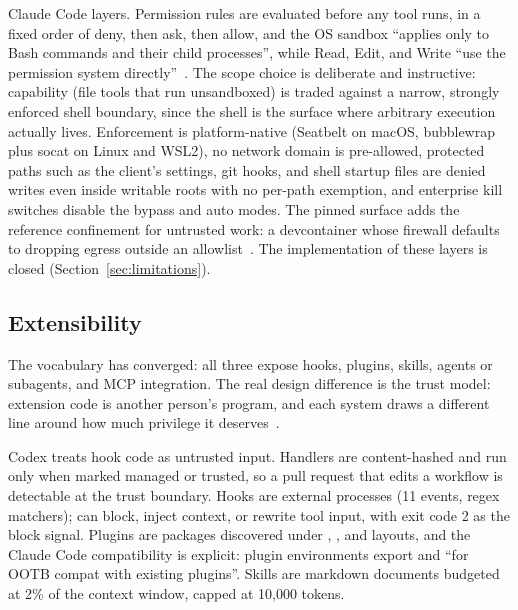 \documentclass{article}
\newcommand{\codex}[0]{Codex}
\newcommand{\ccc}[0]{Claude Code}
\begin{document}
\ccc{} layers. Permission rules are evaluated before any tool runs, in a
fixed order of deny, then ask, then allow, and the OS sandbox ``applies
only to Bash commands and their child processes'', while Read, Edit, and
Write ``use the permission system
directly''~\citep{claudeCodePermissionsDocs,claudeCodeSandboxingDocs,%
claudeCodeHooksDocs}. The scope choice is deliberate and instructive:
capability (file tools that run unsandboxed) is traded against a narrow,
strongly enforced shell boundary, since the shell is the surface where
arbitrary execution actually lives. Enforcement is platform-native
(Seatbelt on macOS, bubblewrap plus socat on Linux and WSL2), no network
domain is pre-allowed, protected paths such as the client's settings, git
hooks, and shell startup files are denied writes even inside writable
roots with no per-path exemption, and enterprise kill switches disable
the bypass and auto modes. The pinned surface adds the reference
confinement for untrusted work: a devcontainer whose firewall defaults to
dropping egress outside an allowlist~\citep{claudeCodeSurface}. The
implementation of these layers is closed (Section~\ref{sec:limitations}).

\subsection{Extensibility}
\label{sec:extensibility}

The vocabulary has converged: all three expose hooks, plugins, skills,
agents or subagents, and MCP integration. The real design difference is
the trust model: extension code is another person's program, and each
system draws a different line around how much privilege it
deserves~\citep{codexRepo,opencodeRepo,claudeCodePluginsDocs}.

\codex{} treats hook code as untrusted input. Handlers are content-hashed
and run only when marked managed or trusted, so a pull request that edits
a workflow is detectable at the trust boundary. Hooks are external
processes (11 events, regex matchers);  can block,
inject context, or rewrite tool input, with exit code 2 as the block
signal. Plugins are  packages discovered
under , , and
 layouts, and the \ccc{} compatibility is explicit:
plugin environments export  and
 ``for OOTB compat with existing plugins''.
Skills are markdown documents budgeted at 2\% of the context window,
capped at 10{,}000 tokens.
\end{document}
